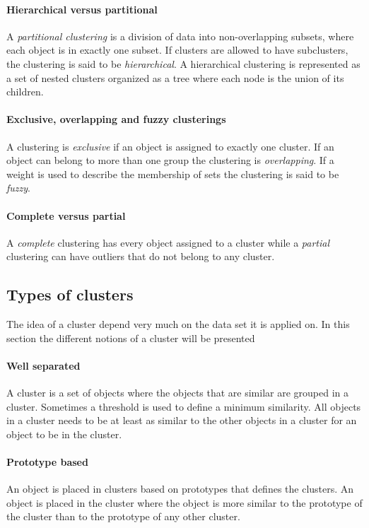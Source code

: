 \paragraph{Hierarchical versus partitional}
A \textit{partitional clustering} is a division of data into non-overlapping subsets, where each object is in exactly one subset.
If clusters are allowed to have subclusters, the clustering is said to be \textit{hierarchical}.
A hierarchical clustering is represented as a set of nested clusters organized as a tree where each node is the union of its children.

\paragraph{Exclusive, overlapping and fuzzy clusterings}

A clustering is \textit{exclusive} if an object is assigned to exactly one cluster.
If an object can belong to more than one group the clustering is \textit{overlapping}.
If a weight is used to describe the membership of sets the clustering is said to be \textit{fuzzy}.

\paragraph{Complete versus partial}

A \textit{complete} clustering has every object assigned to a cluster while a \textit{partial} clustering can have outliers that do not belong to any cluster.

\subsection{Types of clusters}
The idea of a cluster depend very much on the data set it is applied on.
In this section the different notions of a cluster will be presented

\paragraph{Well separated}
A cluster is a set of objects where the objects that are similar are grouped in a cluster. 
Sometimes a threshold is used to define a minimum similarity. 
All objects in a cluster needs to be at least as similar to the other objects in a cluster for an object to be in the cluster.

\paragraph{Prototype based}
An object is placed in clusters based on prototypes that defines the clusters.
An object is placed in the cluster where the object is more similar to the prototype of the cluster than to the prototype of any other cluster.

